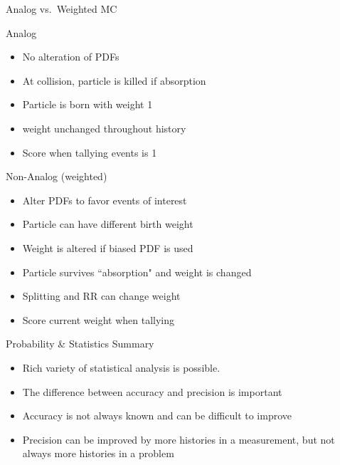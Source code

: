 \documentclass[xcolor=x11names,compress]{beamer}
\renewcommand{\(}{\begin{columns}}
\renewcommand{\)}{\end{columns}}
\newcommand{\<}[1]{\begin{column}{#1}}
\renewcommand{\>}{\end{column}}
\begin{document}
\begin{frame}{Analog vs.\ Weighted MC}

\alert{Analog}
\begin{itemize}
    \item No alteration of PDFs
    \item At collision, particle is killed if absorption
    \item Particle is born with weight 1
    \item weight unchanged throughout history
    \item Score when tallying events is 1
\end{itemize}
\pause

\alert{Non-Analog} (weighted)
\begin{itemize}
    \item Alter PDFs to favor events of interest
    \item Particle can have different birth weight
    \item Weight is altered if biased PDF is used
    \item Particle survives ``absorption" and weight is changed
    \item Splitting and RR can change weight
    \item Score current weight when tallying
    \end{itemize}

\end{frame}


\begin{frame}{Probability \& Statistics Summary}

    \begin{itemize}
    \item Rich variety of statistical analysis is
possible.
\pause
\vspace*{.5em}
    \item The difference between accuracy and
precision is important
\pause
\vspace*{.5em}
    \item Accuracy is not always known and can
be difficult to improve
\pause
\vspace*{.5em}
    \item Precision can be improved by more
histories in a measurement, but not
always more histories in a problem
    \end{itemize}

\end{frame}
\end{document}
